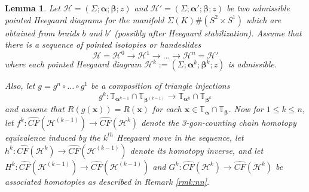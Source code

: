 \documentclass[11pt]{article}
\theoremstyle{plain} \newtheorem{thm}{Theorem}[subsection]
\theoremstyle{plain} \newtheorem{cor}[thm]{Corollary}
\theoremstyle{plain} \newtheorem{prop}[thm]{Proposition}
\theoremstyle{plain} \newtheorem{conj}[thm]{Conjecture}
\theoremstyle{plain} \newtheorem{lem}[thm]{Lemma}
\theoremstyle{definition} \newtheorem{df}[thm]{Definition}
\theoremstyle{remark} \newtheorem{rmk}[thm]{Remark}
\theoremstyle{remark} \newtheorem{obs}[thm]{Observation}
\newcommand{\DBCs}[1]{\Sigma(#1)\#(S^{2}\times S^{1})}
\newcommand{\h}{\mathcal{H}}
\newcommand{\ba}{\boldsymbol{\alpha}}
\newcommand{\bb}{\boldsymbol{\beta}}
\newcommand{\bx}{\mathbf{x}}
\newcommand{\tor}[1]{\mathbb{T}_{#1}}
\begin{document}
\begin{lem}\label{lem:inv1}
Let $\h = \left(\Sigma; \ba; \bb; z\right)$ and $\h' = \left(\Sigma; \ba'; \bb; z\right)$ be two admissible pointed Heegaard diagrams for the manifold $\DBCs{K}$ which are obtained from braids $b$ and $b'$ (possibly after Heegaard stabilization).  Assume that there is a sequence of pointed isotopies or handeslides
$$ \h = \h^0 \rightarrow \h^1 \rightarrow \ldots \rightarrow \h^n = \h'$$
where each pointed Heegaard diagram $\h^k := \left( \Sigma; \ba^k; \bb^k; z\right)$ is admissible.

Also, let $g = g^{n} \circ \ldots \circ g^{1}$ be a composition of triangle injections
\begin{equation*}
g^{k}: \tor{\ba^{k-1}} \cap \tor{\bb^{(k-1)}} \rightarrow \tor{\ba^{k}} \cap \tor{\bb^k}
\end{equation*}
and assume that $R(g(\bx)) = R(\bx)$ for each $\bx \in \tor{\ba}\cap\tor{\bb}$.
Now for $1 \leq k \leq n$, let $f^{k}: \widehat{CF}(\h^{(k-1)}) \rightarrow \widehat{CF}(\h^k)$ denote the 3-gon-counting chain homotopy equivalence induced by the $k^{th}$ Heegaard move in the sequence, let $h^{k}: \widehat{CF}(\h^k) \rightarrow \widehat{CF}(\h^{(k-1)})$ denote its homotopy inverse, and let $H^{k}:\widehat{CF}(\h^{(k-1)}) \rightarrow \widehat{CF}(\h^{(k-1)})$ and $G^{k}:\widehat{CF}(\h^k) \rightarrow \widehat{CF}(\h^k)$ be associated homotopies as described in Remark \ref{rmk:nn}.


\end{lem}
\end{document}
